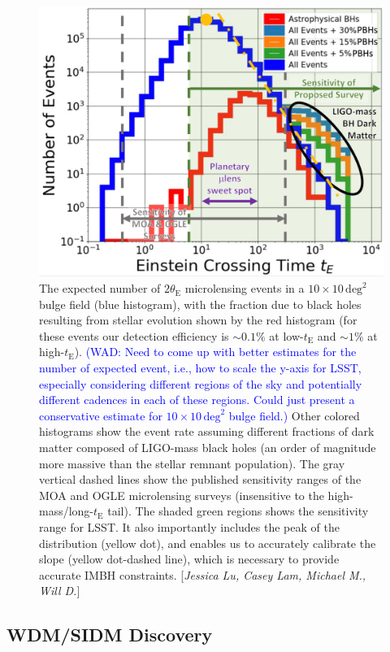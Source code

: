 \documentclass[modern,linenumbers]{aastex62}
\newcommand{\Contributors}[1]{ {\footnotesize [\textit{#1}]}}
\newcommand{\Comment}[3]{\textcolor{#1}{(#2: #3)}}
\newcommand{\WAD}[1]{\Comment{blue}{WAD}{#1}} %
\begin{document}
\begin{figure}[t]
\centering
\includegraphics[width=0.6\columnwidth]{nevents_vs_t.pdf}
\caption{
    \label{fig:macho_discovery}
    The expected number of $2\theta_\mathrm{E}$ microlensing events in a $10\times10\,\mathrm{deg}^2$ bulge field (blue histogram), with the fraction due to black holes resulting from stellar evolution shown by the red histogram (for these events our detection efficiency is $\sim0.1\%$ at low-$t_\mathrm{E}$ and $\sim1\%$ at high-$t_\mathrm{E}$).
    \WAD{Need to come up with better estimates for the number of expected event, i.e., how to scale the y-axis for LSST, especially considering different regions of the sky and potentially different cadences in each of these regions. Could just present a conservative estimate for $10\times10\,\mathrm{deg}^2$ bulge field.}
    Other colored histograms show the event rate assuming different fractions of dark matter composed of LIGO-mass black holes (an order of magnitude more massive than the stellar remnant population).
    The gray vertical dashed lines show the published sensitivity ranges of the MOA and OGLE microlensing surveys (insensitive to the high-mass/long-$t_\mathrm{E}$ tail).
    The shaded green regions shows the sensitivity range for LSST.
    It also importantly includes the peak of the distribution (yellow dot), and enables us to accurately calibrate the slope (yellow dot-dashed line), which is necessary to provide accurate IMBH constraints.
    \Contributors{Jessica Lu, Casey Lam, Michael M., Will D.}
    }
\end{figure}

\subsection{WDM/SIDM Discovery}
\end{document}
